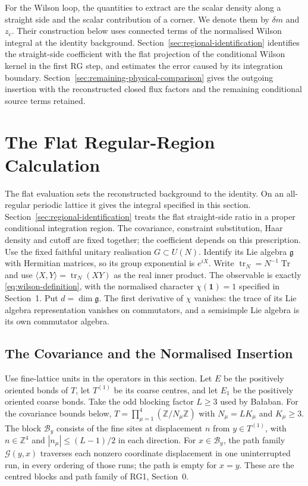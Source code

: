 \documentclass[11pt]{article}
\newcommand{\tr}{\operatorname{tr}}
\newcommand{\id}{\mathbf 1}
\begin{document}
For the Wilson loop, the quantities to extract are the scalar density along a straight side and the scalar contribution of a corner. We denote them by $\delta m$ and $z_{\mathrm c}$. Their construction below uses connected terms of the normalised Wilson integral at the identity background. Section~\ref{sec:regional-identification} identifies the straight-side coefficient with the flat projection of the conditional Wilson kernel in the first RG step, and estimates the error caused by its integration boundary. Section~\ref{sec:remaining-physical-comparison} gives the outgoing insertion with the reconstructed closed flux factors and the remaining conditional source terms retained.
\section{The Flat Regular-Region Calculation}
\label{sec:flat}

The flat evaluation sets the reconstructed background to the identity. On an all-regular periodic lattice it gives the integral specified in this section. Section~\ref{sec:regional-identification} treats the flat straight-side ratio in a proper conditional integration region. The covariance, constraint substitution, Haar density and cutoff are fixed together; the coefficient depends on this prescription.
Use the fixed faithful unitary realisation $G\subset U(N)$. Identify its Lie algebra $\mathfrak g$ with Hermitian matrices, so its group exponential is $e^{iX}$. Write $\tr_N=N^{-1}\operatorname{Tr}$ and use $\langle X,Y\rangle=\tr_N(XY)$ as the real inner product. The observable is exactly \eqref{eq:wilson-definition}, with the normalised character $\chi(\id)=1$ specified in Section~1. Put $d=\dim\mathfrak g$. The first derivative of $\chi$ vanishes: the trace of its Lie algebra representation vanishes on commutators, and a semisimple Lie algebra is its own commutator algebra.

\subsection{The Covariance and the Normalised Insertion}

Use fine-lattice units in the operators in this section. Let $E$ be the positively oriented bonds of $T$, let $T^{(1)}$ be its coarse centres, and let $E_1$ be the positively oriented coarse bonds. Take the odd blocking factor $L\geq 3$ used by Ba{\l}aban. For the covariance bounds below, $T=\prod_{\mu=1}^4(\mathbb Z/N_\mu\mathbb Z)$ with $N_\mu=LK_\mu$ and $K_\mu\geq 3$. The block $\mathcal B_y$ consists of the fine sites at displacement $n$ from $y\in T^{(1)}$, with $n\in\mathbb Z^4$ and $|n_\mu|\leq (L-1)/2$ in each direction. For $x\in\mathcal B_y$, the path family $\mathcal G(y,x)$ traverses each nonzero coordinate displacement in one uninterrupted run, in every ordering of those runs; the path is empty for $x=y$. These are the centred blocks and path family of RG1, Section~0.
\end{document}
